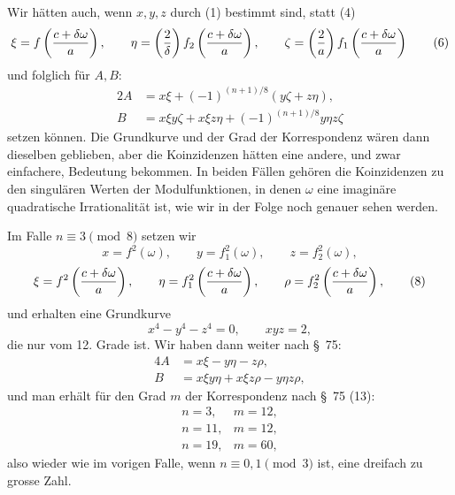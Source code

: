 \documentclass[11pt]{article}
\begin{document}
Wir hätten auch, wenn $x,y,z$ durch (1) bestimmt sind, statt (4)
\begin{equation}
\xi=f\left({c+\delta\omega\over a}\right),\qquad
\eta=\left({2\over\delta}\right)f_2\left({c+\delta\omega\over a}\right),\qquad
\zeta=\left({2\over a}\right)f_1\left({c+\delta\omega\over a}\right)
\tag{6}
\end{equation}
und folglich für $A,B$:
\begin{equation}
\begin{aligned}
2A&=x\xi+(-1)^{(n+1)/8}(y\zeta+z\eta),\\
B&=x\xi y\zeta+x\xi z\eta+(-1)^{(n+1)/8}y\eta z\zeta
\end{aligned}
\tag{7}
\end{equation}
setzen können. Die Grundkurve und der Grad der Korrespondenz wären dann dieselben geblieben, aber die Koinzidenzen hätten eine andere, und zwar einfachere, Bedeutung bekommen. In beiden Fällen gehören die Koinzidenzen zu den singulären Werten der Modulfunktionen, in denen $\omega$ eine imaginäre quadratische Irrationalität ist, wie wir in der Folge noch genauer sehen werden.

Im Falle $n\equiv3\pmod 8$ setzen wir
\begin{equation}
 x=f^2(\omega),\qquad y=f_1^2(\omega),\qquad z=f_2^2(\omega),
\end{equation}
\begin{equation}
 \xi=f^2\left({c+\delta\omega\over a}\right),\qquad
 \eta=f_1^2\left({c+\delta\omega\over a}\right),\qquad
 \rho=f_2^2\left({c+\delta\omega\over a}\right),
\tag{8}
\end{equation}
und erhalten eine Grundkurve
\begin{equation}
 x^4-y^4-z^4=0,
 \qquad
 xyz=2,
\tag{9}
\end{equation}
die nur vom 12. Grade ist. Wir haben dann weiter nach \S~75:
\begin{equation}
\begin{aligned}
4A&=x\xi-y\eta-z\rho,\\
B&=x\xi y\eta+x\xi z\rho-y\eta z\rho,
\end{aligned}
\tag{10}
\end{equation}
und man erhält für den Grad $m$ der Korrespondenz nach \S~75 (13):
\[
\begin{array}{c|c}
 n=3,&m=12,\\
 n=11,&m=12,\\
 n=19,&m=60,
\end{array}
\]
also wieder wie im vorigen Falle, wenn $n\equiv0,1\pmod 3$ ist, eine dreifach zu grosse Zahl.
\end{document}
